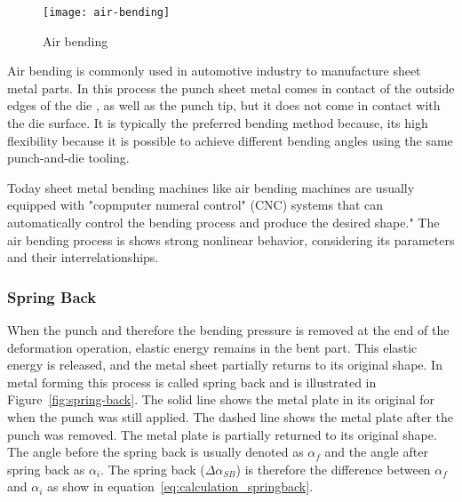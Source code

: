 \begin{figure}[H]
    \centering
    \texttt{[image: air-bending]}
    \caption{Air bending \cite[p. 416]{groover_fundamentalsmodernmanufacturing_2020}}
    \label{fig:air-bending}
\end{figure}

Air bending is commonly used in automotive industry to manufacture sheet metal parts. \cite[p.
342]{kim_predictionbendallowance_2007}
In this process the punch sheet metal comes in contact of the outside edges of the die
, as well
as the punch tip, but it does not come in contact with the die surface.
It is typically the preferred bending method because, its high flexibility because it
is possible
to achieve different bending angles using the same punch-and-die tooling.
\cite[p. 3]{miranda_formingspringbackprediction_2018}\cite[p.
1]{cruz_applicationmachinelearning_2021}

Today sheet metal bending machines like air bending machines are usually equipped with
"copmputer
numeral control" (CNC) systems that can automatically control the bending process and
produce the
desired shape." \cite[p. 3]{miranda_formingspringbackprediction_2018}
The air bending process is shows strong nonlinear behavior, considering its parameters
and their
interrelationships. \cite[p. 3]{miranda_formingspringbackprediction_2018}


\subsubsection{Spring Back}\label{sec:spring-back}
When the punch and therefore the bending pressure is removed at the end of the deformation
operation, elastic energy remains in the bent part. This elastic energy is released,
and the
metal sheet partially returns to its original shape. \cite[p.
113-114]{groover_fundamentalsmodernmanufacturing_2020} In metal forming this process is
called
spring back and is illustrated in Figure~\ref{fig:spring-back}.
The solid line shows the metal plate in its original for when the punch was still
applied. The
dashed line shows the metal plate after the punch was removed. The metal plate is
partially
returned to its original shape. The angle before the spring back is usually denoted as $\alpha_f$
and the angle after spring back as $\alpha_i$.
The spring back ($\Delta \alpha_{SB}$) is therefore the difference between $\alpha_f$ and
$\alpha_i$ as show in equation~\ref*{eq:calculation_springback}. \cite[p.
6]{cruz_applicationmachinelearning_2021}

